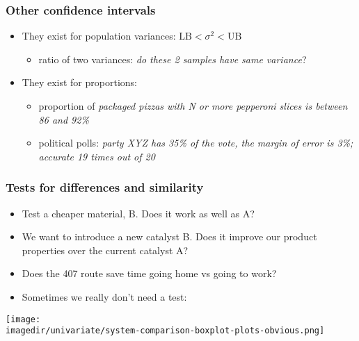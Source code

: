 \begin{frame}\frametitle{Other confidence intervals}
	\begin{itemize}
		\item	They exist for population variances: $\text{LB} < \sigma^2 < \text{UB}$
		\begin{itemize}
			\item	ratio of two variances: \emph{do these 2 samples have same variance}?
		\end{itemize}
		
		\vspace{12pt}
		\item	They exist for proportions:
		\begin{itemize}
			\item	proportion of \emph{packaged pizzas with N or more pepperoni slices is between 86 and 92\%}
			\item	political polls: \emph{party XYZ has 35\% of the vote, the margin of error is 3\%; accurate 19 times out of 20}
		\end{itemize}
	\end{itemize}
\end{frame}

\begin{frame}\frametitle{Tests for differences and similarity}
	\begin{itemize}
		\item	Test a cheaper material, B. Does it work as well as A?
		\item	We want to introduce a new catalyst B. Does it improve our product properties over the current catalyst A?
		\item	Does the 407 route save time going home vs going to work?
	\end{itemize}
	\begin{itemize}
		\item	Sometimes we really don't need a test:
	\end{itemize}
	\begin{center}
		\texttt{[image: \\imagedir/univariate/system-comparison-boxplot-plots-obvious.png]}
	\end{center}
\end{frame}

